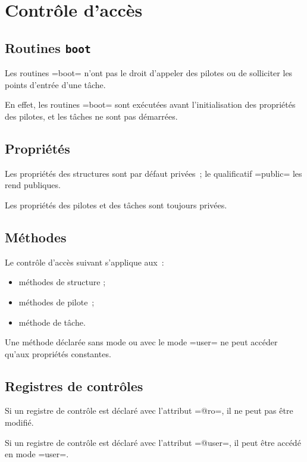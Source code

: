 

\chapter{Contrôle d'accès}



\section{Routines \texttt{boot}}

Les routines \omnibus=boot= n'ont pas le droit d'appeler des pilotes ou de solliciter les points d'entrée d'une tâche.

En effet, les routines \omnibus=boot= sont exécutées avant l'initialisation des propriétés des pilotes, et les tâches ne sont pas démarrées.





\section{Propriétés}

Les propriétés des structures sont par défaut privées~; le qualificatif \omnibus=public= les rend publiques.

Les propriétés des pilotes et des tâches sont toujours privées.







\section{Méthodes}

Le contrôle d'accès suivant s'applique aux~:
\begin{itemize}
  \item méthodes de structure ;
  \item méthodes de pilote~;
  \item méthode de tâche.
\end{itemize}

Une méthode déclarée sans mode ou avec le mode \omnibus=user= ne peut accéder qu'aux propriétés constantes.


\section{Registres de contrôles}

Si un registre de contrôle est déclaré avec l'attribut \omnibus=@ro=, il ne peut pas être modifié.

Si un registre de contrôle est déclaré avec l'attribut \omnibus=@user=, il peut être accédé en mode \omnibus=user=.

